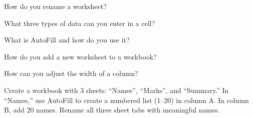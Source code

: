 \begin{reviewqs}
  \item How do you rename a worksheet?
  \item What three types of data can you enter in a cell?
  \item What is AutoFill and how do you use it?
  \item How do you add a new worksheet to a workbook?
  \item How can you adjust the width of a column?
\end{reviewqs}

\begin{challenge}
Create a workbook with 3 sheets: ``Names'', ``Marks'', and ``Summary.'' In ``Names,'' use AutoFill to create a numbered list (1--20) in column A. In column B, add 20 names. Rename all three sheet tabs with meaningful names.
\end{challenge}

